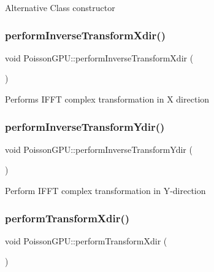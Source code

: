 Alternative Class constructor \mbox{\label{classPoissonGPU_a433c2c82152b2a80a29d2287c722d22d}} 
\subsubsection{\texorpdfstring{perform\+Inverse\+Transform\+Xdir()}{performInverseTransformXdir()}}
{\footnotesize\ttfamily void Poisson\+G\+P\+U\+::perform\+Inverse\+Transform\+Xdir (\begin{DoxyParamCaption}{ }\end{DoxyParamCaption})}

Performs I\+F\+FT complex transformation in X direction \mbox{\label{classPoissonGPU_a8105313f683d3cfc983ee90da970be32}} 
\subsubsection{\texorpdfstring{perform\+Inverse\+Transform\+Ydir()}{performInverseTransformYdir()}}
{\footnotesize\ttfamily void Poisson\+G\+P\+U\+::perform\+Inverse\+Transform\+Ydir (\begin{DoxyParamCaption}{ }\end{DoxyParamCaption})}

Perform I\+F\+FT complex transformation in Y-\/direction \mbox{\label{classPoissonGPU_ab6d57e72e0d430bd0559a4361c94f26a}} 
\subsubsection{\texorpdfstring{perform\+Transform\+Xdir()}{performTransformXdir()}}
{\footnotesize\ttfamily void Poisson\+G\+P\+U\+::perform\+Transform\+Xdir (\begin{DoxyParamCaption}{ }\end{DoxyParamCaption})}

